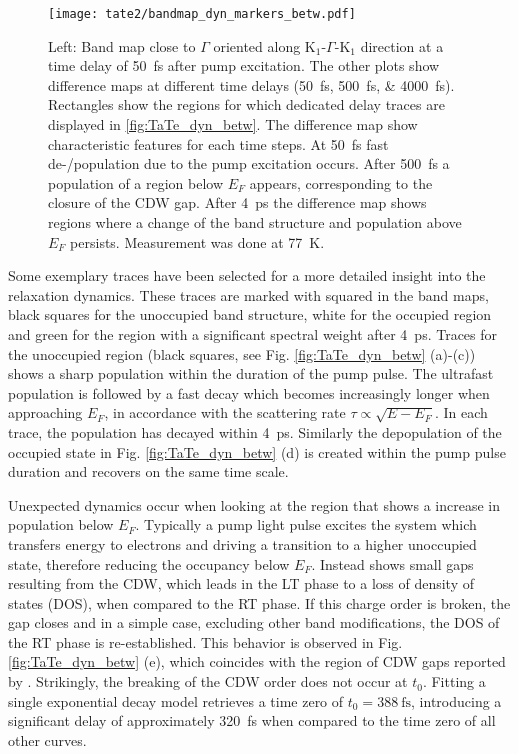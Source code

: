 \begin{figure}[t!]
	\centering
	\texttt{[image: tate2/bandmap\_dyn\_markers\_betw.pdf]}
	\caption{Left: Band map close to $\Gamma$ oriented along K$_1$-$\Gamma$-K$_1$ direction at a time delay of \SI{50}{\femto\second} after pump excitation. The other plots show difference maps at different time delays (\SIlist{50;500;4000}{\femto\second}). Rectangles show the regions for which dedicated delay traces are displayed in \ref{fig:TaTe_dyn_betw}. The difference map show characteristic features for each time steps. At \SI{50}{\femto\second} fast de-/population due to the pump excitation occurs. After \SI{500}{\femto\second} a population of a region below $E_F$ appears, corresponding to the closure of the CDW gap. After \SI{4}{\pico\second} the difference map shows regions where a change of the band structure and population above $E_F$ persists. Measurement was done at \SI{77}{\kelvin}.}
	\label{fig:TaTe_bandmap_dyn_betw}
\end{figure}

Some exemplary traces have been selected for a more detailed insight into the relaxation dynamics.
These traces are marked with squared in the band maps, black squares for the unoccupied band structure, white for the occupied region and green for the region with a significant spectral weight after \SI{4}{\pico\second}.
Traces for the unoccupied region (black squares, see Fig. \ref{fig:TaTe_dyn_betw} (a)-(c)) shows a sharp population within the duration of the pump pulse.
The ultrafast population is followed by a fast decay which becomes increasingly longer when approaching $E_F$, in accordance with the scattering rate $\tau \propto \sqrt{E-E_F}$.
In each trace, the population has decayed within \SI{4}{\pico\second}.
Similarly the depopulation of the occupied state in Fig. \ref{fig:TaTe_dyn_betw} (d) is created within the pump pulse duration and recovers on the same time scale.

Unexpected dynamics occur when looking at the region that shows a increase in population below $E_F$.
Typically a pump light pulse excites the system which transfers energy to electrons and driving a transition to a higher unoccupied state, therefore reducing the occupancy below $E_F$.
Instead  shows small gaps resulting from the CDW, which leads in the LT phase to a loss of density of states (DOS), when compared to the RT phase.
If this charge order is broken, the gap closes and in a simple case, excluding other band modifications, the DOS of the RT phase is re-established.
This behavior is observed in Fig. \ref{fig:TaTe_dyn_betw} (e), which coincides with the region of CDW gaps reported by \cite{lin_evidence_2022}.
Strikingly, the breaking of the CDW order does not occur at $t_0$.
Fitting a single exponential decay model retrieves a time zero of $t_0=\SI{388}{\femto\second}$, introducing a significant delay of approximately \SI{320}{\femto\second} when compared to the time zero of all other curves.

